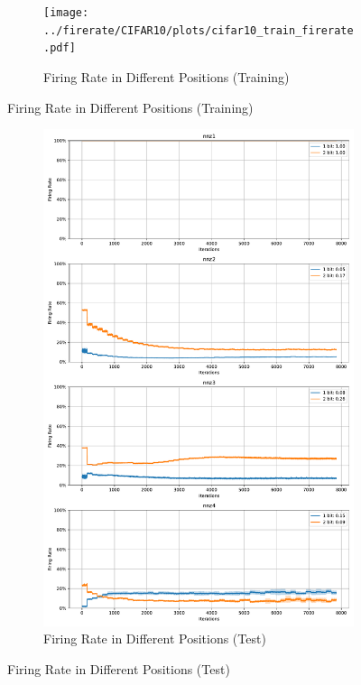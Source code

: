         \begin{figure}[H]
            \centering
            \begin{subfigure}[H]{0.8\textwidth}
                \centering
                \texttt{[image: ../firerate/CIFAR10/plots/cifar10\_train\_firerate.pdf]}
                \caption{Firing Rate in Different Positions (Training)}
            \end{subfigure}
        \end{figure}
        \begin{figure}[H]
            \centering
            \ContinuedFloat
            \begin{subfigure}[H]{0.8\textwidth}
                \centering
                \includegraphics[width=\textwidth]{../firerate/CIFAR10/plots/cifar10_test_firerate.pdf}
                \caption{Firing Rate in Different Positions (Test)}
            \end{subfigure}
        \end{figure}
